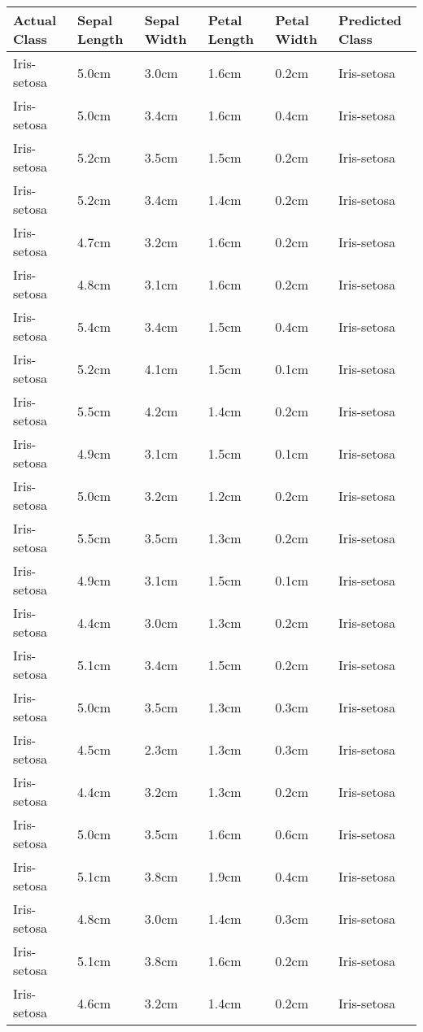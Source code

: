 \documentclass[a4paper, 12pt]{article}
\begin{document}
		\begin{center}
		\footnotesize
		\setlength\LTleft{-20pt}
		\setlength\LTright{-30pt}   
		\begin{longtable}{ l l l l l l }
			\hline
			Actual Class & Sepal Length & Sepal Width & Petal Length & Petal Width & Predicted Class\\
			\hline
			Iris-setosa & 5.0cm & 3.0cm & 1.6cm & 0.2cm & Iris-setosa\\
Iris-setosa & 5.0cm & 3.4cm & 1.6cm & 0.4cm & Iris-setosa\\
Iris-setosa & 5.2cm & 3.5cm & 1.5cm & 0.2cm & Iris-setosa\\
Iris-setosa & 5.2cm & 3.4cm & 1.4cm & 0.2cm & Iris-setosa\\
Iris-setosa & 4.7cm & 3.2cm & 1.6cm & 0.2cm & Iris-setosa\\
Iris-setosa & 4.8cm & 3.1cm & 1.6cm & 0.2cm & Iris-setosa\\
Iris-setosa & 5.4cm & 3.4cm & 1.5cm & 0.4cm & Iris-setosa\\
Iris-setosa & 5.2cm & 4.1cm & 1.5cm & 0.1cm & Iris-setosa\\
Iris-setosa & 5.5cm & 4.2cm & 1.4cm & 0.2cm & Iris-setosa\\
Iris-setosa & 4.9cm & 3.1cm & 1.5cm & 0.1cm & Iris-setosa\\
Iris-setosa & 5.0cm & 3.2cm & 1.2cm & 0.2cm & Iris-setosa\\
Iris-setosa & 5.5cm & 3.5cm & 1.3cm & 0.2cm & Iris-setosa\\
Iris-setosa & 4.9cm & 3.1cm & 1.5cm & 0.1cm & Iris-setosa\\
Iris-setosa & 4.4cm & 3.0cm & 1.3cm & 0.2cm & Iris-setosa\\
Iris-setosa & 5.1cm & 3.4cm & 1.5cm & 0.2cm & Iris-setosa\\
Iris-setosa & 5.0cm & 3.5cm & 1.3cm & 0.3cm & Iris-setosa\\
Iris-setosa & 4.5cm & 2.3cm & 1.3cm & 0.3cm & Iris-setosa\\
Iris-setosa & 4.4cm & 3.2cm & 1.3cm & 0.2cm & Iris-setosa\\
Iris-setosa & 5.0cm & 3.5cm & 1.6cm & 0.6cm & Iris-setosa\\
Iris-setosa & 5.1cm & 3.8cm & 1.9cm & 0.4cm & Iris-setosa\\
Iris-setosa & 4.8cm & 3.0cm & 1.4cm & 0.3cm & Iris-setosa\\
Iris-setosa & 5.1cm & 3.8cm & 1.6cm & 0.2cm & Iris-setosa\\
Iris-setosa & 4.6cm & 3.2cm & 1.4cm & 0.2cm & Iris-setosa\\

\end{longtable}
\end{center}
\end{document}
